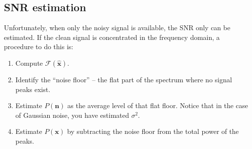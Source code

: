 \subsection{SNR estimation}
Unfortunately, when only the noisy signal is available, the \gls{SNR}
only can be estimated. If the clean signal is concentrated in the
frequency domain, a procedure to do this is:
\begin{enumerate}
\item Compute $\mathcal{F}(\hat{\bm{x}})$.
\item Identify the ``noise floor'' -- the flat part of the spectrum
  where no signal peaks exist.
\item Estimate $P(\bm{n})$ as the average level of that flat
  floor. Notice that in the case of Gaussian noise, you have estimated
  $\sigma^2$.
\item Estimate $P(\bm{x})$ by subtracting the noise floor from the
  total power of the peaks.
\end{enumerate}





